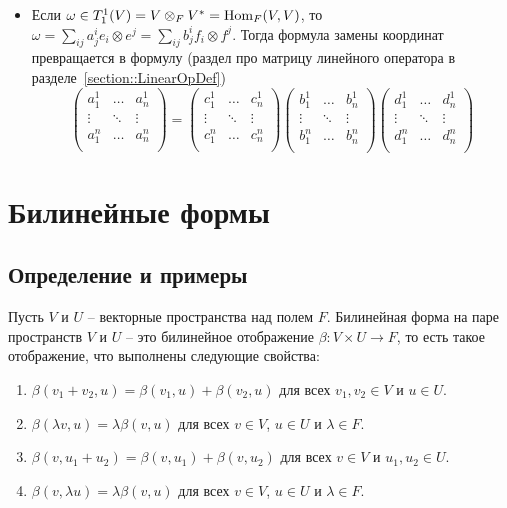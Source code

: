 \begin{itemize}
\item Если $\omega\in T^1_1(V) = V\otimes_F V^* = \operatorname{Hom}_F(V, V)$, то $\omega = \sum_{ij}a^i_j e_i \otimes e^j = \sum_{ij} b^i_j f_i\otimes f^j$. Тогда формула замены координат превращается в формулу (раздел про матрицу линейного оператора в разделе~\ref{section::LinearOpDef})
\[
\begin{pmatrix}
{a^1_1}&{\ldots}&{a^1_n}\\
{\vdots}&{\ddots}&{\vdots}\\
{a^n_1}&{\ldots}&{a^n_n}\\
\end{pmatrix}
=
\begin{pmatrix}
{c^1_1}&{\ldots}&{c^1_n}\\
{\vdots}&{\ddots}&{\vdots}\\
{c^n_1}&{\ldots}&{c^n_n}\\
\end{pmatrix}
\begin{pmatrix}
{b^1_1}&{\ldots}&{b^1_n}\\
{\vdots}&{\ddots}&{\vdots}\\
{b^n_1}&{\ldots}&{b^n_n}\\
\end{pmatrix}
\begin{pmatrix}
{d^1_1}&{\ldots}&{d^1_n}\\
{\vdots}&{\ddots}&{\vdots}\\
{d^n_1}&{\ldots}&{d^n_n}\\
\end{pmatrix}
\]
\end{itemize}



\newpage
\section{Билинейные формы}

\subsection{Определение и примеры}

\begin{definition}\label{def::BilinearForms}
Пусть $V$ и $U$ -- векторные пространства над полем $F$. Билинейная форма на паре пространств $V$ и $U$ -- это билинейное отображение $\beta\colon V\times U \to F$, то есть такое отображение, что выполнены следующие свойства:
\begin{enumerate}
\item $\beta(v_1 + v_2, u) = \beta(v_1,u) + \beta(v_2,u)$ для всех $v_1,v_2\in V$ и $u\in U$.

\item $\beta(\lambda v, u) = \lambda \beta(v,u)$ для всех $v\in V$, $u\in U$ и $\lambda\in F$.

\item $\beta(v, u_1+u_2) = \beta(v, u_1) + \beta(v,u_2)$ для всех $v\in V$ и $u_1,u_2\in U$.
\item $\beta(v,\lambda u) = \lambda\beta(v,u)$ для всех $v\in V$, $u\in U$ и $\lambda\in F$.
\end{enumerate}
\end{definition}


